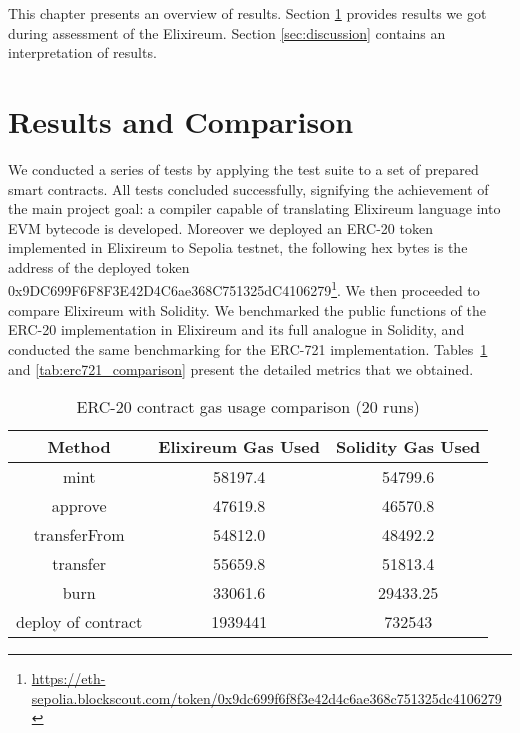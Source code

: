 This chapter presents an overview of results. Section \ref{sec:results_and_comparison} provides results we got during assessment of the Elixireum. Section \ref{sec:discussion} contains an interpretation of results.

\section{Results and Comparison}
\label{sec:results_and_comparison}
We conducted a series of tests by applying the test suite to a set of prepared smart contracts. All tests concluded successfully, signifying the achievement of the main project goal: a compiler capable of translating Elixireum language into EVM bytecode is developed. Moreover we deployed an ERC-20 token implemented in Elixireum to Sepolia testnet, the following hex bytes is the address of the deployed token 0x9DC699F6F8F3E42D4C6ae368C751325dC4106279\footnote{\url{https://eth-sepolia.blockscout.com/token/0x9dc699f6f8f3e42d4c6ae368c751325dc4106279}}. We then proceeded to compare Elixireum with Solidity. We benchmarked the public functions of the ERC-20 implementation in Elixireum and its full analogue in Solidity, and conducted the same benchmarking for the ERC-721 implementation. Tables~\ref{tab:erc20_comparison} and \ref{tab:erc721_comparison} present the detailed metrics that we obtained.


\begin{table}[h!]
\centering
\renewcommand{\arraystretch}{1.2}
\begin{tabular}{|c|c|c|}
\hline
\textbf{Method} & \textbf{Elixireum Gas Used} & \textbf{Solidity Gas Used} \\ \hline
mint            & 58197.4              & 54799.6              \\ \hline
approve         & 47619.8              & 46570.8              \\ \hline
transferFrom    & 54812.0              & 48492.2              \\ \hline
transfer        & 55659.8              & 51813.4              \\ \hline
burn            & 33061.6              & 29433.25             \\ \hline
deploy of contract       & 1939441              & 732543               \\ \hline
\end{tabular}
\caption{ERC-20 contract gas usage comparison (20 runs)}
\label{tab:erc20_comparison}
\end{table}

